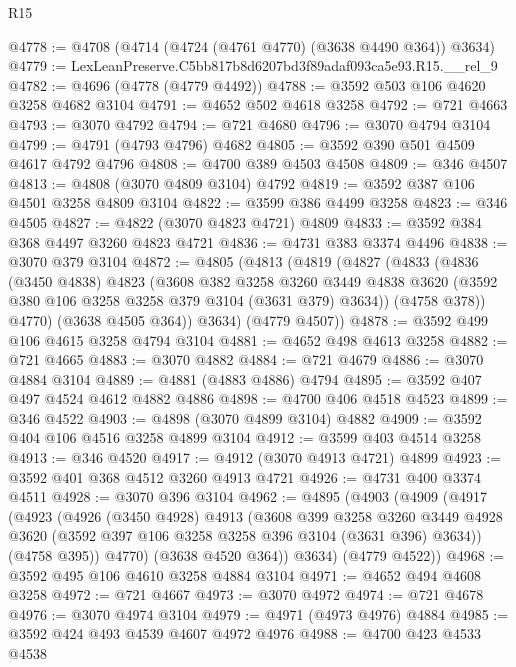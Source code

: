 \begin{lexlean}{R15}
\begin{coremodule}
@4778 := @4708 (@4714 (@4724 (@4761 @4770) (@3638 @4490 @364)) @3634)
@4779 := LexLeanPreserve.C5bb817b8d6207bd3f89adaf093ca5e93.R15.__rel_9
@4782 := @4696 (@4778 (@4779 @4492))
@4788 := @3592 @503 @106 @4620 @3258 @4682 @3104
@4791 := @4652 @502 @4618 @3258
@4792 := @721 @4663
@4793 := @3070 @4792
@4794 := @721 @4680
@4796 := @3070 @4794 @3104
@4799 := @4791 (@4793 @4796) @4682
@4805 := @3592 @390 @501 @4509 @4617 @4792 @4796
@4808 := @4700 @389 @4503 @4508
@4809 := @346 @4507
@4813 := @4808 (@3070 @4809 @3104) @4792
@4819 := @3592 @387 @106 @4501 @3258 @4809 @3104
@4822 := @3599 @386 @4499 @3258
@4823 := @346 @4505
@4827 := @4822 (@3070 @4823 @4721) @4809
@4833 := @3592 @384 @368 @4497 @3260 @4823 @4721
@4836 := @4731 @383 @3374 @4496
@4838 := @3070 @379 @3104
@4872 := @4805
    (@4813
      (@4819
        (@4827
          (@4833
            (@4836
              (@3450 @4838)
              @4823
              (@3608
                @382
                @3258
                @3260
                @3449
                @4838
                @3620
                (@3592 @380 @106 @3258 @3258 @379 @3104 (@3631 @379) @3634))
              (@4758 @378))
            @4770)
          (@3638 @4505 @364))
        @3634)
      (@4779 @4507))
@4878 := @3592 @499 @106 @4615 @3258 @4794 @3104
@4881 := @4652 @498 @4613 @3258
@4882 := @721 @4665
@4883 := @3070 @4882
@4884 := @721 @4679
@4886 := @3070 @4884 @3104
@4889 := @4881 (@4883 @4886) @4794
@4895 := @3592 @407 @497 @4524 @4612 @4882 @4886
@4898 := @4700 @406 @4518 @4523
@4899 := @346 @4522
@4903 := @4898 (@3070 @4899 @3104) @4882
@4909 := @3592 @404 @106 @4516 @3258 @4899 @3104
@4912 := @3599 @403 @4514 @3258
@4913 := @346 @4520
@4917 := @4912 (@3070 @4913 @4721) @4899
@4923 := @3592 @401 @368 @4512 @3260 @4913 @4721
@4926 := @4731 @400 @3374 @4511
@4928 := @3070 @396 @3104
@4962 := @4895
    (@4903
      (@4909
        (@4917
          (@4923
            (@4926
              (@3450 @4928)
              @4913
              (@3608
                @399
                @3258
                @3260
                @3449
                @4928
                @3620
                (@3592 @397 @106 @3258 @3258 @396 @3104 (@3631 @396) @3634))
              (@4758 @395))
            @4770)
          (@3638 @4520 @364))
        @3634)
      (@4779 @4522))
@4968 := @3592 @495 @106 @4610 @3258 @4884 @3104
@4971 := @4652 @494 @4608 @3258
@4972 := @721 @4667
@4973 := @3070 @4972
@4974 := @721 @4678
@4976 := @3070 @4974 @3104
@4979 := @4971 (@4973 @4976) @4884
@4985 := @3592 @424 @493 @4539 @4607 @4972 @4976
@4988 := @4700 @423 @4533 @4538

\end{coremodule}
\end{lexlean}
